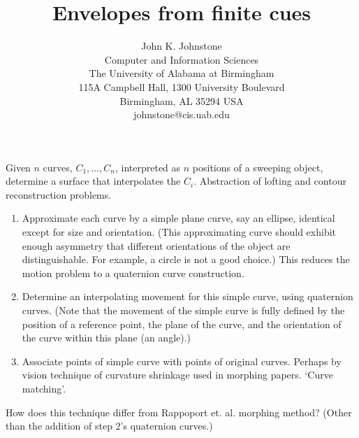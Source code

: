 
\title{Envelopes from finite cues}
\author{John K. Johnstone\\
        Computer and Information Sciences\\
        The University of Alabama at Birmingham\\
        115A Campbell Hall, 1300 University Boulevard\\
        Birmingham, AL 35294 USA\\
        johnstone@cis.uab.edu}







Given $n$ curves, $C_1,\ldots,C_n$, interpreted as $n$ positions of a sweeping object,
determine a surface that interpolates the $C_i$.
Abstraction of lofting and contour reconstruction problems.

\begin{enumerate}
\item
	Approximate each curve by a simple plane curve, say an ellipse,
	identical except for size and orientation.
	(This approximating curve should exhibit enough asymmetry that
	different orientations of the object are distinguishable.
	For example, a circle is not a good choice.)
	This reduces the motion problem to a quaternion curve construction.
\item
	Determine an interpolating movement for this simple curve,
	using quaternion curves.
	(Note that the movement of the simple curve is fully defined
	by the position of a reference point, the plane of the curve,
	and the orientation of the curve within this plane (an angle).)
\item
	Associate points of simple curve with points of original curves.
	Perhaps by vision technique of curvature shrinkage used in morphing
	papers.
	`Curve matching'.
\end{enumerate}

How does this technique differ from Rappoport et. al. morphing method?
(Other than the addition of step 2's quaternion curves.)


